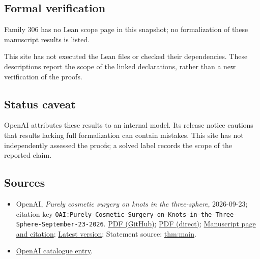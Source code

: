 \documentclass[11pt]{article}
\begin{document}
\subsection{Formal verification}
Family 306 has no Lean scope page in this snapshot; no formalization of these manuscript results is listed.

This site has not executed the Lean files or checked their dependencies. These descriptions report the scope of the linked declarations, rather than a new verification of the proofs.

\subsection{Status caveat}
OpenAI attributes these results to an internal model. Its release notice cautions that results lacking full formalization can contain mistakes. This site has not independently assessed the proofs; a solved label records the scope of the reported claim.

\subsection{Sources}
\begin{itemize}
\item OpenAI, \emph{Purely cosmetic surgery on knots in the three-sphere}, 2026-09-23; citation key \texttt{OAI:Purely-Cosmetic-Surgery-on-Knots-in-the-Three-Sphere-September-23-2026}. \href{https://github.com/openai/math/blob/adc7f1241b42e322a6451854ab7e4b4c146bf78a/preprints/Purely-Cosmetic-Surgery-on-Knots-in-the-Three-Sphere-September-23-2026/paper.pdf}{PDF (GitHub)}; \href{https://github.com/openai/math/raw/adc7f1241b42e322a6451854ab7e4b4c146bf78a/preprints/Purely-Cosmetic-Surgery-on-Knots-in-the-Three-Sphere-September-23-2026/paper.pdf}{PDF (direct)}; \href{https://github.com/openai/math/blob/adc7f1241b42e322a6451854ab7e4b4c146bf78a/preprints/Purely-Cosmetic-Surgery-on-Knots-in-the-Three-Sphere-September-23-2026/README.md}{Manuscript page and citation}; \href{https://github.com/openai/math/blob/main/preprints/Purely-Cosmetic-Surgery-on-Knots-in-the-Three-Sphere-September-23-2026/paper.pdf}{Latest version}; Statement source: \href{https://github.com/openai/math/blob/adc7f1241b42e322a6451854ab7e4b4c146bf78a/preprints/Purely-Cosmetic-Surgery-on-Knots-in-the-Three-Sphere-September-23-2026/build/sections/01-introduction.tex\#L13}{thm:main}.
\item \href{https://github.com/openai/math/blob/adc7f1241b42e322a6451854ab7e4b4c146bf78a/CONTENTS.md}{OpenAI catalogue entry}.
\end{itemize}
\end{document}
